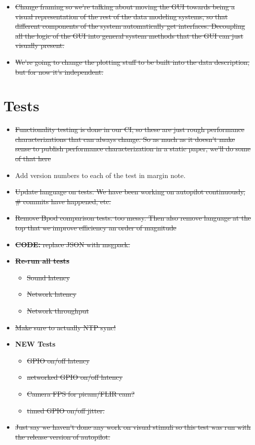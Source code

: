 \begin{itemize}
\item \sout{Change framing so we're talking about moving the GUI towards being a visual representation of the rest of the data modeling systems, so that different components of the system automatically get interfaces. Decoupling all the logic of the GUI into general system methods that the GUI can just visually present.}
\item \sout{We're going to change the plotting stuff to be built into the data description, but for now it's independent.}
\end{itemize}


\section{Tests}

\begin{itemize}
\item \sout{Functionality testing is done in our CI, so these are just rough performance characterizations that can always change. So as much as it doesn't make sense to publish performance characterization in a static paper, we'll do some of that here}
\item Add version numbers to each of the test in margin note.
\item \sout{Update language on tests. We have been working on autopilot continuously, \# commits have happened, etc.}
\item \sout{Remove Bpod comparison tests. too messy. Then also remove language at the top that we improve efficiency an order of magnitude}
\item \sout{\textbf{CODE:} replace JSON with msgpack.}
\item \sout{\textbf{Re-run all tests} }
\begin{itemize}
\item \sout{Sound latency}
\item \sout{Network latency}
\item \sout{Network throughput}
\end{itemize}
\item \sout{Make sure to actually NTP sync!}
\item \textbf{NEW Tests}
\begin{itemize}
\item \sout{GPIO on/off latency}
\item \sout{networked GPIO on/off latency}
\item \sout{Camera FPS for picam/FLIR cam?}
\item \sout{timed GPIO on/off jitter.}
\end{itemize}
\item \sout{Just say we haven't done any work on visual stimuli so this test was run with the release version of autopilot.}

\end{itemize}